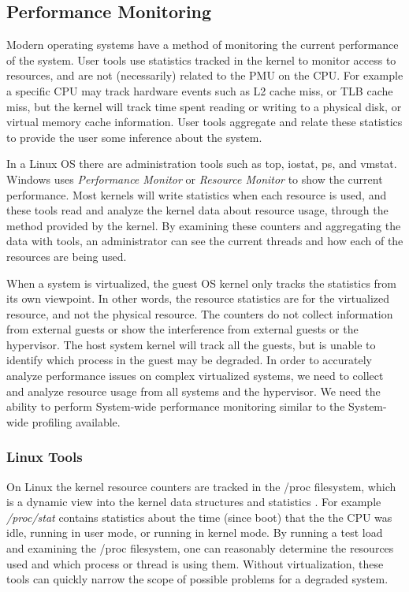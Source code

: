 \subsection{Performance Monitoring}
Modern operating systems have a method of monitoring the current performance of the system.  User tools use statistics tracked in the kernel to monitor access to resources, and are not (necessarily) related to the PMU on the CPU.  For example a specific CPU may track hardware events such as L2 cache miss, or TLB cache miss, but the kernel will track time spent reading or writing to a physical disk, or virtual memory cache information.  User tools aggregate and relate these statistics to provide the user some inference about the system.

\indent In a Linux OS there are administration tools such as top, iostat, ps, and vmstat.  
Windows uses \emph{Performance Monitor} or \emph{Resource Monitor} to show the current performance.  
Most kernels will write statistics when each resource is used, and these tools read and analyze the kernel data about resource usage, through the method provided by the kernel.
By examining these counters and aggregating the data with tools, an administrator can see the current threads and how each of the resources are being used. 

\indent When a system is virtualized, the guest OS kernel only tracks the statistics from its own viewpoint.  
In other words, the resource statistics are for the virtualized resource, and not the physical resource.   
The counters do not collect information from external guests or show the interference from external guests or the hypervisor.  
The host system kernel will track all the guests, but is unable to identify which process in the guest may be degraded.
In order to accurately analyze performance issues on complex virtualized systems, we need to collect and analyze resource usage from all systems and the hypervisor.  
We need the ability to perform System-wide performance monitoring similar to the System-wide profiling available.

\subsubsection{Linux Tools}
\indent On Linux the kernel resource counters are tracked in the /proc filesystem, which is a dynamic view into the kernel data structures and statistics \cite{proc}.  
For example \emph{/proc/stat} contains statistics about the time (since boot) that the the CPU was idle, running in user mode, or running in kernel mode.
By running a test load and examining the /proc filesystem, one can reasonably determine the resources used and which process or thread is using them.  
Without virtualization, these tools can quickly narrow the scope of possible problems for a degraded system. 

